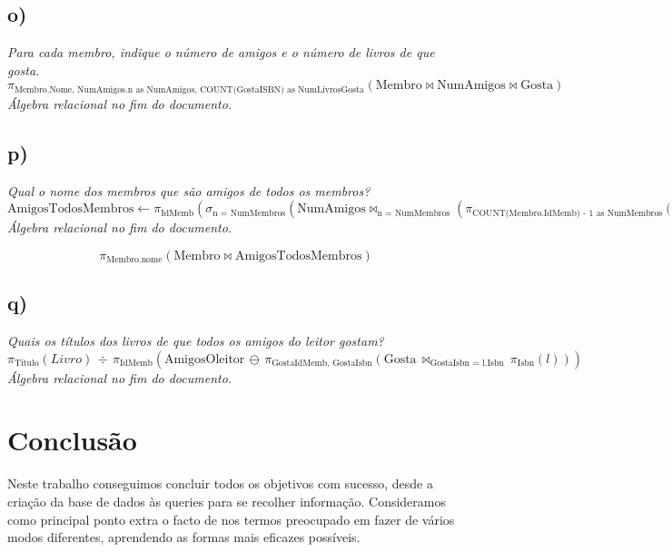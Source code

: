 \documentclass {report}
\begin{document}
\subsection{o)}
\textit{Para cada membro, indique o número de amigos e o número de livros de que gosta.}
\[
\pi_{\text{Membro.Nome, NumAmigos.n as NumAmigos, COUNT(GostaISBN) as NumLivrosGosta}}\left(\text{Membro} \bowtie \text{NumAmigos} \bowtie \text{Gosta} \right)
\]
\textit{Álgebra relacional no fim do documento.}

\subsection{p)}
\textit{Qual o nome dos membros que são amigos de todos os membros?}
\[
\text{AmigosTodosMembros} \leftarrow \pi_{\text{IdMemb}}\left(\sigma_{\text{n = NumMembros}}\left(\text{NumAmigos} \bowtie_{\text{n = NumMembros}} \left(\pi_{\text{COUNT(Membro.IdMemb) - 1 as NumMembros}}(\text{Membro})\right)\right)\right)
\]
\textit{Álgebra relacional no fim do documento.}


\[
\pi_{\text{Membro.nome}}\left(\text{Membro} \bowtie \text{AmigosTodosMembros} \right)
\]


\subsection{q)}
\textit{Quais os títulos dos livros de que todos os amigos do leitor gostam?}
\[
\pi_{\text{Titulo}}(Livro) \, \div \, \pi_{\text{IdMemb}}(\text{AmigosOleitor} \, \ominus \, \pi_{\text{GostaIdMemb, GostaIsbn}}(\text{Gosta} \, \bowtie_{\text{GostaIsbn = l.Isbn}} \, \pi_{\text{Isbn}}(l)))
\]
\textit{Álgebra relacional no fim do documento.}
%


\section{Conclusão}
\hspace{1cm}Neste trabalho conseguimos concluir todos os objetivos com sucesso,
desde a criação da base de dados às queries para se recolher informação.
Consideramos como principal ponto extra o facto de nos termos preocupado
em fazer de vários modos diferentes, aprendendo as formas mais eficazes possíveis.
	
\end{document}
